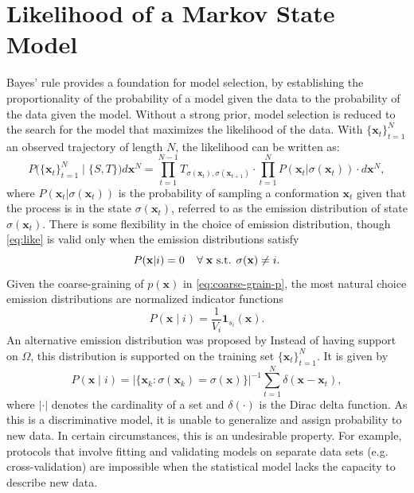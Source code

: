 \documentclass[journal=jpcbfk, layout=traditional, manuscript=article]{achemso}
\begin{document}
\section{Likelihood of a Markov State Model}
Bayes' rule provides a foundation for model selection, by establishing the proportionality of the probability of a model given the data to the probability of the data given the model. Without a strong prior, model selection is reduced to the search for the model that maximizes the likelihood of the data. 
With $\{\mathbf{x}_t\}_{t=1}^N$ an observed trajectory of length $N$, the likelihood can be written as:
\begin{equation}
P\big(\{\mathbf{x}_t\}_{t=1}^N\;\big|\; \{S, T\}\big)d\mathbf{x}^N = \prod_{t=1}^{N-1} T_{\sigma(\mathbf{x}_t), \sigma(\mathbf{x}_{t+1})} \cdot \prod_{t=1}^{N} P(\mathbf{x}_t | \sigma(\mathbf{x}_t)) \cdot d\mathbf{x}^N,
\label{eq:like}
\end{equation} 
where $P(\mathbf{x}_t | \sigma(\mathbf{x}_t))$ is the probability of sampling a conformation $\mathbf{x}_t$ given that the process is in the state $\sigma(\mathbf{x}_t)$, referred to as the emission distribution of state $\sigma(\mathbf{x}_t)$. There is some flexibility in the choice of emission distribution, though \cref{eq:like} is valid only when the emission distributions satisfy
\begin{equation}
P(\mathbf{x} | i) = 0 \;\;\;\; \forall \; \mathbf{x} \textnormal{ s.t. } \sigma(\mathbf{x}) \neq i.
\end{equation}
Given the coarse-graining of $p(\mathbf{x})$ in \cref{eq:coarse-grain-p}, the most natural choice emission distributions are normalized indicator functions
\begin{equation}
P(\mathbf{x} \;|\; i) = \frac{1}{V_i} \mathbf{1}_{s_i}(\mathbf{x}).
\end{equation}
An alternative emission distribution was proposed by \citet{Kellogg2012Evaluation} Instead of having support on $\Omega$, this distribution is supported on the training set $\{\mathbf{x}_t\}_{t=1}^N$. It is given by
\begin{equation}
P(\mathbf{x} \;|\; i) = \big| \{ \mathbf{x}_k : \sigma(\mathbf{x}_k) = \sigma(\mathbf{x}) \} \big|^{-1} \sum_{t=1}^N \delta(\mathbf{x}-\mathbf{x}_t),
\end{equation} where $| \cdot |$ denotes the cardinality of a set and $\delta(\cdot)$ is the Dirac delta function. As this is a discriminative model, it is unable to generalize and assign probability to new data. In certain circumstances, this is an undesirable property. For example, protocols that involve fitting and validating models on separate data sets (e.g. cross-validation) are impossible when the statistical model lacks the capacity to describe new data.
\end{document}
